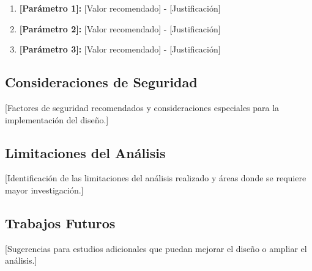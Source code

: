 \documentclass[12pt,letterpaper]{article}
\begin{document}
\begin{enumerate}
    \item \textbf{[Parámetro 1]:} [Valor recomendado] - [Justificación]
    \item \textbf{[Parámetro 2]:} [Valor recomendado] - [Justificación]
    \item \textbf{[Parámetro 3]:} [Valor recomendado] - [Justificación]
\end{enumerate}

\subsection{Consideraciones de Seguridad}
[Factores de seguridad recomendados y consideraciones especiales para la implementación del diseño.]

\subsection{Limitaciones del Análisis}
[Identificación de las limitaciones del análisis realizado y áreas donde se requiere mayor investigación.]

\subsection{Trabajos Futuros}
[Sugerencias para estudios adicionales que puedan mejorar el diseño o ampliar el análisis.]

\newpage


\end{document}
